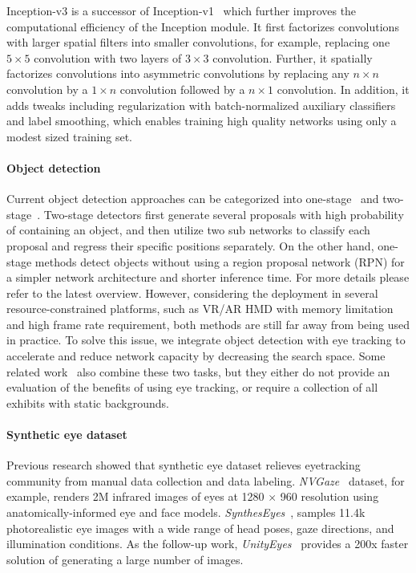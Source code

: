 Inception-v3 is a successor of Inception-v1~\cite{szegedy2015going} which
further improves the computational efficiency of the Inception module. It first
factorizes convolutions with larger spatial filters into smaller convolutions,
for example, replacing one $5 \times 5$ convolution with two layers of $3 \times
3$ convolution. Further, it spatially factorizes convolutions into asymmetric
convolutions by replacing any $n \times n$ convolution by a $1 \times n$
convolution followed by a $n \times 1$ convolution. In addition, it adds tweaks
including regularization with batch-normalized auxiliary classifiers and label
smoothing, which enables training high quality networks using only a modest
sized training set.

\paragraph{Object detection}

Current object detection approaches can be categorized into
one-stage~\cite{redmon2016you, liu2016ssd, lin2017focal} and
two-stage~\cite{girshick2014rich, girshick2015fast, ren2015faster, he2017mask}.
Two-stage detectors first generate several proposals with high probability of
containing an object, and then utilize two sub networks to classify each
proposal and regress their specific positions separately. On the other hand,
one-stage methods detect objects without using a region proposal network (RPN)
for a simpler network architecture and shorter inference time. For more details
please refer to the latest overview\cite{liu2020deep}. However, considering the
deployment in several resource-constrained platforms, such as VR/AR HMD with
memory limitation and high frame rate requirement, both methods are still far
away from being used in practice. To solve this issue, we integrate object
detection with eye tracking to accelerate and reduce network capacity by
decreasing the search space. Some related work~\cite{toyama2012gaze,
ishiguro2010aided, bonino2009blueprint} also combine these two tasks, but they
either do not provide an evaluation of the benefits of using eye tracking, or
require a collection of all exhibits with static backgrounds.

\paragraph{Synthetic eye dataset}

Previous research showed that synthetic eye dataset relieves eyetracking
community from manual data collection and data labeling.
\emph{NVGaze}~\cite{kim2019nvgaze} dataset, for example, renders 2M infrared
images of eyes at 1280 \(\times\) 960 resolution using anatomically-informed eye
and face models.  \emph{SynthesEyes}~\cite{wood2015rendering}, samples 11.4k
photorealistic eye images with a wide range of head poses, gaze directions, and
illumination conditions. As the follow-up work,
\emph{UnityEyes}~\cite{wood2016learning} provides a 200x faster solution of
generating a large number of images.
